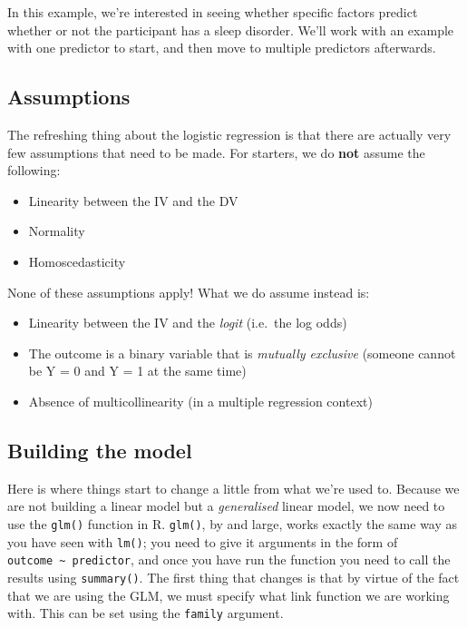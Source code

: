 \documentclass[
]{book}
\providecommand{\tightlist}{%
  \setlength{\itemsep}{0pt}\setlength{\parskip}{0pt}}
\begin{document}
In this example, we're interested in seeing whether specific factors predict whether or not the participant has a sleep disorder. We'll work with an example with one predictor to start, and then move to multiple predictors afterwards.

\subsection{Assumptions}\label{assumptions-3}

The refreshing thing about the logistic regression is that there are actually very few assumptions that need to be made. For starters, we do \textbf{not} assume the following:

\begin{itemize}
\tightlist
\item
  Linearity between the IV and the DV
\item
  Normality
\item
  Homoscedasticity
\end{itemize}

None of these assumptions apply! What we do assume instead is:

\begin{itemize}
\tightlist
\item
  Linearity between the IV and the \emph{logit} (i.e.~the log odds)
\item
  The outcome is a binary variable that is \emph{mutually exclusive} (someone cannot be Y = 0 and Y = 1 at the same time)
\item
  Absence of multicollinearity (in a multiple regression context)
\end{itemize}

\subsection{Building the model}\label{building-the-model}

Here is where things start to change a little from what we're used to. Because we are not building a linear model but a \emph{generalised} linear model, we now need to use the \texttt{glm()} function in R. \texttt{glm()}, by and large, works exactly the same way as you have seen with \texttt{lm()}; you need to give it arguments in the form of \texttt{outcome\ \textasciitilde{}\ predictor}, and once you have run the function you need to call the results using \texttt{summary()}. The first thing that changes is that by virtue of the fact that we are using the GLM, we must specify what link function we are working with. This can be set using the \texttt{family} argument.
\end{document}
